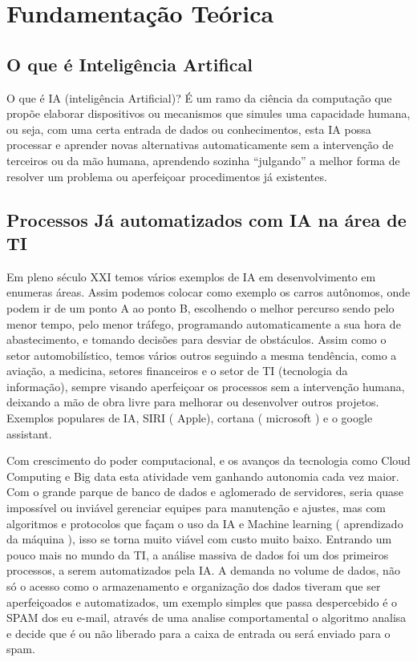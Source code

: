 \chapter{Fundamentação Teórica}
\section{O que é Inteligência Artifical}
O que é IA (inteligência Artificial)?  É um ramo da ciência da computação que propõe elaborar dispositivos ou mecanismos que simules uma capacidade humana, ou seja, com uma certa entrada de dados ou conhecimentos, esta IA possa processar e aprender novas alternativas automaticamente sem a intervenção de terceiros ou da mão humana, aprendendo sozinha “julgando” a melhor forma de resolver um problema ou aperfeiçoar procedimentos já existentes. 

\section{Processos Já automatizados com IA na área de TI}
	Em pleno século XXI temos vários exemplos de IA em desenvolvimento em enumeras áreas. Assim podemos colocar como exemplo os carros autônomos, onde podem ir de um ponto A ao ponto B, escolhendo o melhor percurso sendo pelo menor tempo, pelo menor tráfego, programando automaticamente a sua hora de abastecimento, e tomando decisões para desviar de obstáculos.
	Assim como o setor automobilístico, temos vários outros seguindo a mesma tendência, como a aviação, a medicina, setores financeiros e o setor de TI (tecnologia da informação), sempre visando aperfeiçoar os processos sem a intervenção humana, deixando a mão de obra livre para melhorar ou desenvolver outros projetos. Exemplos populares de IA, SIRI ( Apple), cortana ( microsoft ) e o google assistant. 
	
	Com crescimento do poder computacional, e os avanços da tecnologia como Cloud Computing e Big data esta atividade vem ganhando autonomia cada vez maior. Com o grande parque de banco de dados e aglomerado de servidores, seria quase impossível ou inviável gerenciar equipes para manutenção e ajustes, mas com algoritmos e protocolos que façam o uso da IA e Machine learning ( aprendizado da máquina ), isso se torna muito viável com custo muito baixo.
	Entrando um pouco mais no mundo da TI, a análise massiva de dados  foi um dos primeiros processos, a serem automatizados pela IA. A demanda no volume de dados, não só o acesso como o armazenamento e organização dos dados tiveram que ser aperfeiçoados e automatizados, um exemplo simples que passa despercebido  é o SPAM dos eu e-mail, através de uma analise comportamental o algoritmo analisa e decide que é ou não liberado para a caixa de entrada ou será enviado para  o spam. 


